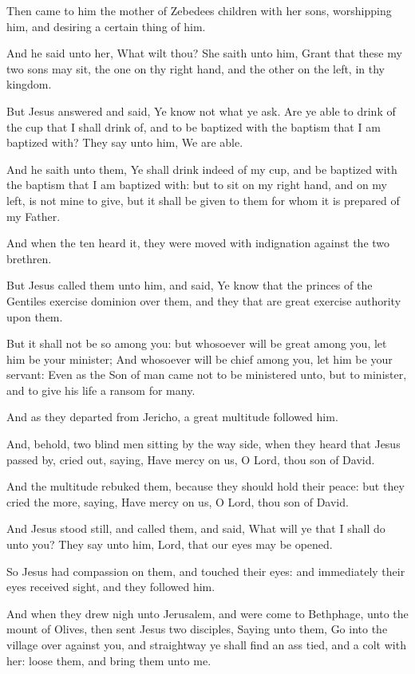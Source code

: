 \Verse Then came to him the mother of Zebedees children with her sons, worshipping him, and desiring a certain thing of him.

\Verse And he said unto her, What wilt thou? She saith unto him, Grant that these my two sons may sit, the one on thy right hand, and the other on the left, in thy kingdom.

\Verse But Jesus answered and said, Ye know not what ye ask. Are ye able to drink of the cup that I shall drink of, and to be baptized with the baptism that I am baptized with? They say unto him, We are able.

\Verse And he saith unto them, Ye shall drink indeed of my cup, and be baptized with the baptism that I am baptized with: but to sit on my right hand, and on my left, is not mine to give, but it shall be given to them for whom it is prepared of my Father.

\Verse And when the ten heard it, they were moved with indignation against the two brethren.

\Verse But Jesus called them unto him, and said, Ye know that the princes of the Gentiles exercise dominion over them, and they that are great exercise authority upon them.

\Verse But it shall not be so among you: but whosoever will be great among you, let him be your minister; \Verse And whosoever will be chief among you, let him be your servant: \Verse Even as the Son of man came not to be ministered unto, but to minister, and to give his life a ransom for many.

\Verse And as they departed from Jericho, a great multitude followed him.

\Verse And, behold, two blind men sitting by the way side, when they heard that Jesus passed by, cried out, saying, Have mercy on us, O Lord, thou son of David.

\Verse And the multitude rebuked them, because they should hold their peace: but they cried the more, saying, Have mercy on us, O Lord, thou son of David.

\Verse And Jesus stood still, and called them, and said, What will ye that I shall do unto you?  \Verse They say unto him, Lord, that our eyes may be opened.

\Verse So Jesus had compassion on them, and touched their eyes: and immediately their eyes received sight, and they followed him.


\Chapter
\Verse And when they drew nigh unto Jerusalem, and were come to Bethphage, unto the mount of Olives, then sent Jesus two disciples, \Verse Saying unto them, Go into the village over against you, and straightway ye shall find an ass tied, and a colt with her: loose them, and bring them unto me.


